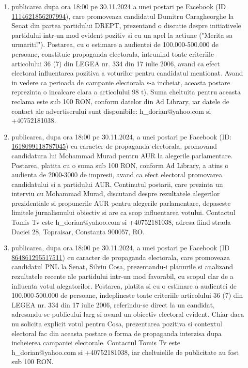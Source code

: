 \documentclass[a4paper,12pt]{article}
\begin{document}
\begin{enumerate}[leftmargin=*, label=\arabic*.)]
    \item publicarea dupa ora 18:00 pe 30.11.2024 a unei postari pe Facebook (ID \href{https://www.facebook.com/ads/library/?id=1114621856207994}{1114621856207994}), care promoveaza candidatul Dumitru Caragheorghe la Senat din partea partidului DREPT, prezentand o discutie despre initiativele partidului intr-un mod evident pozitiv si cu un apel la actiune ("Merita sa urmariti!").  Postarea, cu o estimare a audientei de 100.000-500.000 de persoane, constituie propaganda electorala, intrunind toate criteriile articolului 36 (7) din LEGEA nr. 334 din 17 iulie 2006, avand ca efect electoral influentarea pozitiva a voturilor pentru candidatul mentionat.  Avand in vedere ca perioada de campanie electorala s-a incheiat, aceasta postare reprezinta o incalcare clara a articolului 98 t).  Suma cheltuita pentru aceasta reclama este sub 100 RON, conform datelor din Ad Library, iar datele de contact ale advertiserului sunt disponibile: h\_dorian@yahoo.com si +40752181038.
    \item publicarea, dupa ora 18:00 pe 30.11.2024, a unei postari pe Facebook (ID: \href{https://www.facebook.com/ads/library/?id=1618099118787045}{1618099118787045}) cu caracter de propaganda electorala, promovand candidatura lui Mohammad Murad pentru AUR la alegerile parlamentare. Postarea, platita cu o suma sub 100 RON, conform Ad Library, a atins o audienta de 2000-3000 de impresii, avand ca efect electoral promovarea candidatului si a partidului AUR.  Continutul postarii, care prezinta un interviu cu Mohammad Murad, discutand despre rezultatele alegerilor prezidentiale si propunerile AUR pentru alegerile parlamentare, depaseste limitele jurnalismului obiectiv si are ca scop influentarea votului.  Contactul Tomis Tv este h\_dorian@yahoo.com si +40752181038, adresa fiind strada Daciei 28, Topraisar, Constanta 900057, RO.
    \item publicarea, dupa ora 18:00 pe 30.11.2024, a unei postari pe Facebook (ID \href{https://www.facebook.com/ads/library/?id=864861295517511}{864861295517511}) cu caracter de propaganda electorala, care promoveaza candidatul PNL la Senat, Silviu Cosa, prezentandu-i planurile si analizand rezultatele recente ale partidului intr-un mod favorabil, cu scopul clar de a influenta votul alegatorilor.  Postarea, platita si cu o estimare a audientei de 100.000-500.000 de persoane, indeplineste toate criteriile articolului 36 (7) din LEGEA nr. 334 din 17 iulie 2006, referindu-se direct la un candidat, adresandu-se publicului larg si avand un obiectiv electoral evident.  Chiar daca nu solicita explicit votul pentru Cosa, prezentarea pozitiva si contextul electoral fac din aceasta postare o forma de propaganda interzisa dupa incheierea campaniei electorale.  Contactul Tomis Tv este h\_dorian@yahoo.com si +40752181038, iar cheltuielile de publicitate au fost sub 100 RON.
\end{enumerate}
\end{document}
